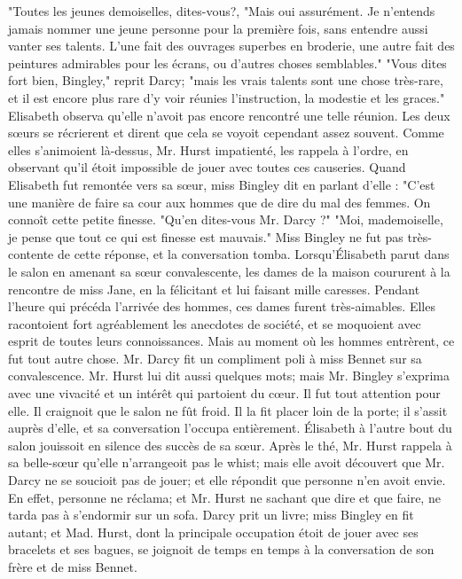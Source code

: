 \setcounter{page}{393}
"Toutes les jeunes demoiselles, dites-vous?, "Mais oui assurément. Je n'entends jamais nommer une jeune personne pour la première fois, sans entendre aussi vanter ses talents. L'une fait des ouvrages superbes en broderie, une autre fait des peintures admirables pour les écrans, ou d'autres choses semblables."
"Vous dites fort bien, Bingley," reprit Darcy; "mais les vrais talents sont une chose très-rare, et il est encore plus rare d'y voir réunies l'instruction, la modestie et les graces."
Elisabeth observa qu'elle n'avoit pas encore rencontré une telle réunion. Les deux sœurs se récrierent et dirent que cela se voyoit cependant assez souvent. Comme elles s'animoient là-dessus, Mr. Hurst impatienté, les rappela à l'ordre, en observant qu'il étoit impossible de jouer avec toutes ces causeries.
Quand Elisabeth fut remontée vers sa sœur, miss Bingley dit en parlant d'elle : "C'est une manière de faire sa cour aux hommes que de dire du mal des femmes. On connoît cette petite finesse. "Qu'en dites-vous Mr. Darcy ?"
"Moi, mademoiselle, je pense que tout ce qui est finesse est mauvais."
\setcounter{page}{394}
Miss Bingley ne fut pas très-contente de cette réponse, et la conversation tomba.
Lorsqu'Élisabeth parut dans le salon en amenant sa sœur convalescente, les dames de la maison coururent à la rencontre de miss Jane, en la félicitant et lui faisant mille caresses. Pendant l'heure qui précéda l'arrivée des hommes, ces dames furent très-aimables. Elles racontoient fort agréablement les anecdotes de société, et se moquoient avec esprit de toutes leurs connoissances. Mais au moment où les hommes entrèrent, ce fut tout autre chose. Mr. Darcy fit un compliment poli à miss Bennet sur sa convalescence. Mr. Hurst lui dit aussi quelques mots; mais Mr. Bingley s'exprima avec une vivacité et un intérêt qui partoient du cœur. Il fut tout attention pour elle. Il craignoit que le salon ne fût froid. Il la fit placer loin de la porte; il s'assit auprès d'elle, et sa conversation l'occupa entièrement. Élisabeth à l'autre bout du salon jouissoit en silence des succès de sa sœur.
Après le thé, Mr. Hurst rappela à sa belle-sœur qu'elle n'arrangeoit pas le whist; mais elle avoit découvert que Mr. Darcy ne se soucioit pas de jouer; et elle répondit que personne n'en avoit envie. En effet, personne\setcounter{page}{395} ne réclama; et Mr. Hurst ne sachant que dire et que faire, ne tarda pas à s'endormir sur un sofa. Darcy prit un livre; miss Bingley en fit autant; et Mad. Hurst, dont la principale occupation étoit de jouer avec ses bracelets et ses bagues, se joignoit de temps en temps à la conversation de son frère et de miss Bennet.
